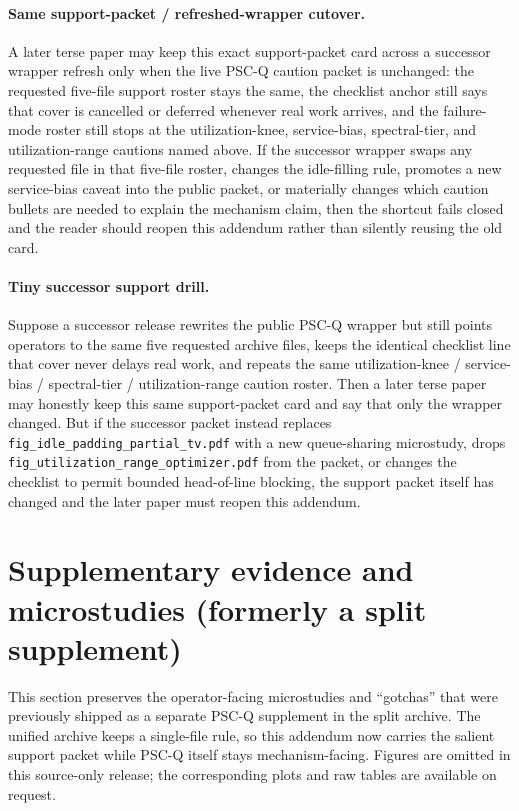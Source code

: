 \documentclass[11pt]{article}
\theoremstyle{definition}
\theoremstyle{remark}
\begin{document}
\paragraph{Same support-packet / refreshed-wrapper cutover.}
A later terse paper may keep this exact support-packet card across a successor wrapper refresh only when the live PSC-Q caution packet is unchanged: the requested five-file support roster stays the same, the checklist anchor still says that cover is cancelled or deferred whenever real work arrives, and the failure-mode roster still stops at the utilization-knee, service-bias, spectral-tier, and utilization-range cautions named above.
If the successor wrapper swaps any requested file in that five-file roster, changes the idle-filling rule, promotes a new service-bias caveat into the public packet, or materially changes which caution bullets are needed to explain the mechanism claim, then the shortcut fails closed and the reader should reopen this addendum rather than silently reusing the old card.

\paragraph{Tiny successor support drill.}
Suppose a successor release rewrites the public PSC-Q wrapper but still points operators to the same five requested archive files, keeps the identical checklist line that cover never delays real work, and repeats the same utilization-knee / service-bias / spectral-tier / utilization-range caution roster.
Then a later terse paper may honestly keep this same support-packet card and say that only the wrapper changed.
But if the successor packet instead replaces \texttt{fig\_idle\_padding\_partial\_tv.pdf} with a new queue-sharing microstudy, drops \texttt{fig\_utilization\_range\_optimizer.pdf} from the packet, or changes the checklist to permit bounded head-of-line blocking, the support packet itself has changed and the later paper must reopen this addendum.

\section{Supplementary evidence and microstudies (formerly a split supplement)}\label{app:microstudies}
This section preserves the operator-facing microstudies and ``gotchas'' that were previously shipped as a separate PSC-Q supplement in the split archive. The unified archive keeps a single-file rule, so this addendum now carries the salient support packet while PSC-Q itself stays mechanism-facing. Figures are omitted in this source-only release; the corresponding plots and raw tables are available on request.
\end{document}

